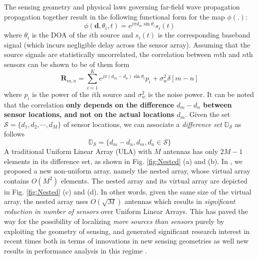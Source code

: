 The sensing geometry and physical laws governing far-field wave propagation propagation together result in the following functional form for the map $\phi(.)$: \[ \phi(\mathbf{d},\theta_i,t) =  e^{j\pi d_m \sin\theta_i}s_i(t)  \]
where $\theta_i$ is the DOA of the $i$th source and $s_i(t)$ is the corresponding baseband signal (which incurs negligible delay across the sensor array). Assuming that the source signals are statistically uncorrelated, the correlation between $m$th and $n$th sensors can be shown to be of them form \[ \mathbf{R}_{m,n} = \sum_{i=1}^{K}e^{j\pi (d_m-d_n)\sin\theta_i} p_i + \sigma^2_w\delta[m-n] \]
where $p_i$ is the power of the $i$th source and $\sigma^2_w$ is the noise power. 
It can be noted that the correlation {\bf only depends on the difference $d_m-d_n$ between sensor locations, and not on the actual locations $d_m$}. %
Given the set $\mathcal{S} = \{d_1,d_2,\cdots, d_M\} $ of sensor locations,  we can associate a {\em difference set} $\mathbb{D}_{\mathcal{S}}$ as follows \[ \mathbb{D}_{\mathcal{S}}=\{d_m-d_n, d_m, d_n\in \mathcal{S} \} \] 
A traditional Uniform Linear Array (ULA) with $M$ antennas has only $2M-1$ elements in its difference set, as shown in Fig. \ref{fig:Nested} (a) and (b). In \cite{PiyaNested}, we proposed a new non-uniform array, namely the nested array, whose virtual array contains $O(M^2)$ elements. 
The nested array and its virtual array are depicted in Fig. \ref{fig:Nested} (c) and (d). In other words, given the same size of the virtual array, the nested array uses $O(\sqrt{M})$ antennas which results in {\em significant reduction in number of sensors} over Uniform Linear Arrays. This has paved the way for the possibility of localizing {\em more sources than sensors} purely by exploiting the geometry of sensing, and generated significant research interest in recent times both in terms of innovations in new sensing geometries \cite{} as well new results in performance analysis in this regime \cite{}. \\


